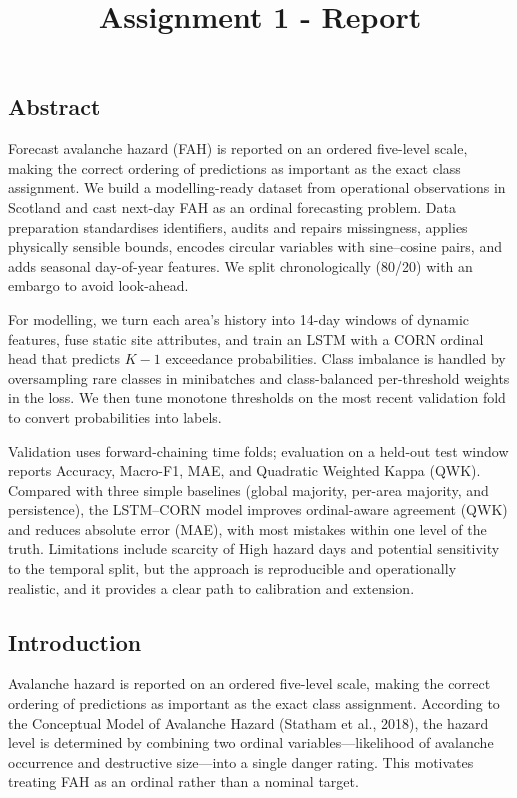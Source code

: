 \documentclass[
  letterpaper,
  DIV=11,
  numbers=noendperiod]{scrartcl}
\title{Assignment 1 - Report}
\author{}
\date{}
\begin{document}
\maketitle


\subsection{Abstract}\label{abstract}

Forecast avalanche hazard (FAH) is reported on an ordered five-level
scale, making the correct ordering of predictions as important as the
exact class assignment. We build a modelling-ready dataset from
operational observations in Scotland and cast next-day FAH as an ordinal
forecasting problem. Data preparation standardises identifiers, audits
and repairs missingness, applies physically sensible bounds, encodes
circular variables with sine--cosine pairs, and adds seasonal
day-of-year features. We split chronologically (80/20) with an embargo
to avoid look-ahead.

For modelling, we turn each area's history into 14-day windows of
dynamic features, fuse static site attributes, and train an LSTM with a
CORN ordinal head that predicts \(K - 1\) exceedance probabilities.
Class imbalance is handled by oversampling rare classes in minibatches
and class-balanced per-threshold weights in the loss. We then tune
monotone thresholds on the most recent validation fold to convert
probabilities into labels.

Validation uses forward-chaining time folds; evaluation on a held-out
test window reports Accuracy, Macro-F1, MAE, and Quadratic Weighted
Kappa (QWK). Compared with three simple baselines (global majority,
per-area majority, and persistence), the LSTM--CORN model improves
ordinal-aware agreement (QWK) and reduces absolute error (MAE), with
most mistakes within one level of the truth. Limitations include
scarcity of High hazard days and potential sensitivity to the temporal
split, but the approach is reproducible and operationally realistic, and
it provides a clear path to calibration and extension.

\subsection{Introduction}\label{introduction}

Avalanche hazard is reported on an ordered five-level scale, making the
correct ordering of predictions as important as the exact class
assignment. According to the Conceptual Model of Avalanche Hazard
(Statham et al., 2018), the hazard level is determined by combining two
ordinal variables---likelihood of avalanche occurrence and destructive
size---into a single danger rating. This motivates treating FAH as an
ordinal rather than a nominal target.
\end{document}
